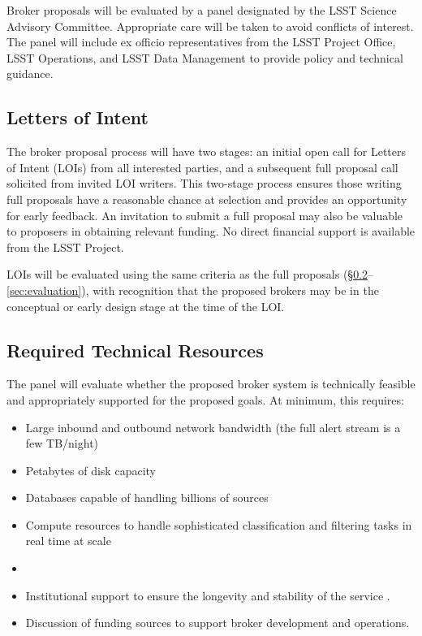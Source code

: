 Broker proposals will be evaluated by a panel designated by the LSST Science Advisory Committee.  Appropriate care will be taken to avoid conflicts of interest.
The panel will include ex officio representatives from the LSST Project Office, LSST Operations, and LSST Data Management to provide policy and technical guidance.

\subsection{Letters of Intent} \label{sec:LOIs}

The broker proposal process will have two stages:  
an initial open call for Letters of Intent (LOIs) from all interested parties, and a subsequent full proposal call solicited from invited LOI writers.
This two-stage process ensures those writing full proposals have a reasonable chance at selection and provides an opportunity for early feedback.
An invitation to submit a full proposal may also be valuable to proposers in obtaining relevant funding.
No direct financial support is available from the LSST Project.

LOIs will be evaluated using the same criteria as the full proposals (\S \ref{sec:resources}--\ref{sec:evaluation}), with recognition that the proposed brokers may be in the conceptual or early design stage at the time of the LOI.


\subsection{Required Technical Resources} \label{sec:resources}

The panel will evaluate whether the proposed broker system is technically feasible and appropriately supported for the proposed goals.  
At minimum, this requires:

\begin{itemize}
	\item Large inbound and outbound network bandwidth (the full alert stream is a few TB/night)
	\item Petabytes of disk capacity
	\item Databases capable of handling billions of sources
	\item Compute resources to handle sophisticated classification and filtering tasks in real time at scale
	\item {} 
	\item Institutional support to ensure the longevity and stability of the service .
	\item Discussion of funding sources to support broker development and operations.
\end{itemize}

